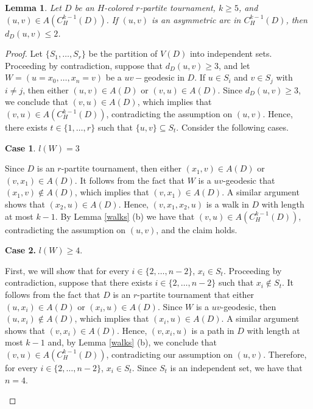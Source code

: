 \documentclass[10pt,a4paper]{article}
\newtheorem{lemma}[theorem]{Lemma}
\begin{document}
\begin{lemma}
\label{distrpartite}
Let $D$ be an $H$-colored $r$-partite tournament, $k \geq 5$, and $(u,v) \in A(C_{H}^{k-1}(D))$. If $(u,v)$ is an asymmetric arc in $C_{H}^{k-1}(D)$, then $d_{D}(u,v) \leq 2$.
\end{lemma}
\begin{proof}
Let $\{ S_{1}, \ldots , S_{r} \}$ be the partition of $V(D)$ into independent sets. Proceeding by contradiction, suppose that $d_{D}(u,v) \geq 3$, and let $W=(u=x_{0}, \ldots , x_{n}=v)$ be a $uv-$geodesic in $D$. If $u \in S_{i}$ and $v \in S_{j}$ with $i \neq j$, then either $(u,v) \in A(D)$ or $(v,u) \in A(D)$. Since $d_{D}(u,v) \geq 3$, we conclude that $(v,u) \in A(D)$, which implies that $(v,u) \in A(C_{H}^{k-1}(D))$, contradicting the assumption on $(u,v)$. Hence, there exists $t \in \{1, \ldots , r \}$ such that $\{u,v \} \subseteq S_{t}$.  Consider the following cases.

\begin{description}
\item \textbf{Case 1}. $l(W)=3$

Since $D$ is an $r$-partite tournament, then either $(x_{1},v) \in A(D)$ or $(v,x_{1}) \in A(D)$. It follows from the fact that $W$ is a $uv$-geodesic that $(x_{1}, v) \notin A(D)$, which implies that $(v,x_{1}) \in A(D)$. A similar argument shows that $(x_{2},u) \in A(D)$. Hence, $(v,x_{1}, x_{2}, u)$ is a walk in $D$ with length at most $k-1$. By Lemma \ref{walks} (b) we have that $(v,u) \in A(C_{H}^{k-1}(D))$, contradicting the assumption on $(u,v)$, and the claim holds.

\item \textbf{Case 2.} $l(W) \geq 4$.

First, we will show that for every $i \in \{2, \ldots , n-2\}$, $x_{i} \in S_{t}$. Proceeding by contradiction, suppose that there exists $i \in \{ 2, \ldots , n-2 \}$ such that $x_{i} \notin S_{t}$. It follows from the fact that $D$ is an $r$-partite tournament that either $(u,x_{i}) \in A(D)$ or $(x_{i}, u) \in A(D)$. Since $W$ is a $uv$-geodesic, then $(u,x_{i} ) \notin A(D)$, which implies that $(x_{i}, u) \in A(D)$. A similar argument shows that $(v,x_{i}) \in A(D)$. Hence, $(v,x_{i},u)$ is a path in $D$ with length at most $k-1$ and, by Lemma \ref{walks} (b), we conclude that $(v,u) \in A(C_{H}^{k-1}(D))$, contradicting our assumption on $(u,v)$. Therefore, for every $i \in \{2, \ldots , n-2\}$, $x_{i} \in S_{t}$. Since $S_{t}$ is an independent set, we have that $n=4$.  


\end{description}
\end{proof}
\end{document}
